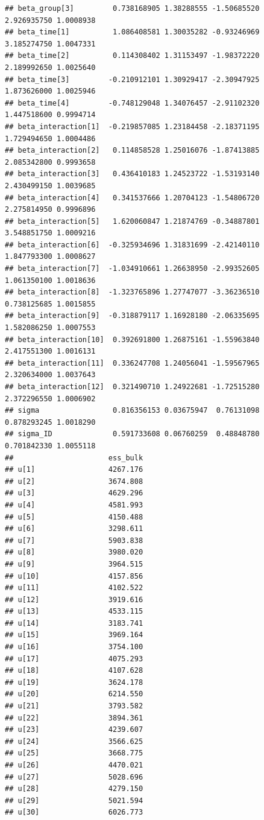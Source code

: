 \documentclass[
]{book}
\begin{document}
\begin{verbatim}
## beta_group[3]         0.738168905 1.38288555 -1.50685520  2.926935750 1.0008938
## beta_time[1]          1.086408581 1.30035282 -0.93246969  3.185274750 1.0047331
## beta_time[2]          0.114308402 1.31153497 -1.98372220  2.189992650 1.0025640
## beta_time[3]         -0.210912101 1.30929417 -2.30947925  1.873626000 1.0025946
## beta_time[4]         -0.748129048 1.34076457 -2.91102320  1.447518600 0.9994714
## beta_interaction[1]  -0.219857085 1.23184458 -2.18371195  1.729494650 1.0004486
## beta_interaction[2]   0.114858528 1.25016076 -1.87413885  2.085342800 0.9993658
## beta_interaction[3]   0.436410183 1.24523722 -1.53193140  2.430499150 1.0039685
## beta_interaction[4]   0.341537666 1.20704123 -1.54806720  2.275814950 0.9996896
## beta_interaction[5]   1.620060847 1.21874769 -0.34887801  3.548851750 1.0009216
## beta_interaction[6]  -0.325934696 1.31831699 -2.42140110  1.847793300 1.0008627
## beta_interaction[7]  -1.034910661 1.26638950 -2.99352605  1.061350100 1.0018636
## beta_interaction[8]  -1.323765896 1.27747077 -3.36236510  0.738125685 1.0015855
## beta_interaction[9]  -0.318879117 1.16928180 -2.06335695  1.582086250 1.0007553
## beta_interaction[10]  0.392691800 1.26875161 -1.55963840  2.417551300 1.0016131
## beta_interaction[11]  0.336247708 1.24056041 -1.59567965  2.320634000 1.0037643
## beta_interaction[12]  0.321490710 1.24922681 -1.72515280  2.372296550 1.0006902
## sigma                 0.816356153 0.03675947  0.76131098  0.878293245 1.0018290
## sigma_ID              0.591733608 0.06760259  0.48848780  0.701842330 1.0055118
##                      ess_bulk
## u[1]                 4267.176
## u[2]                 3674.808
## u[3]                 4629.296
## u[4]                 4581.993
## u[5]                 4150.488
## u[6]                 3298.611
## u[7]                 5903.838
## u[8]                 3980.020
## u[9]                 3964.515
## u[10]                4157.856
## u[11]                4102.522
## u[12]                3919.616
## u[13]                4533.115
## u[14]                3183.741
## u[15]                3969.164
## u[16]                3754.100
## u[17]                4075.293
## u[18]                4107.628
## u[19]                3624.178
## u[20]                6214.550
## u[21]                3793.582
## u[22]                3894.361
## u[23]                4239.607
## u[24]                3566.625
## u[25]                3668.775
## u[26]                4470.021
## u[27]                5028.696
## u[28]                4279.150
## u[29]                5021.594
## u[30]                6026.773

\end{verbatim}
\end{document}
